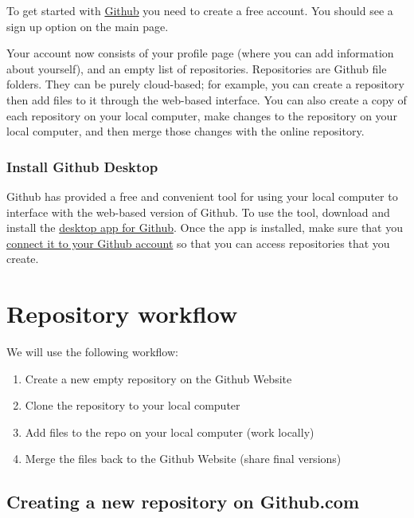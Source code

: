 \documentclass[]{book}
\providecommand{\tightlist}{%
  \setlength{\itemsep}{0pt}\setlength{\parskip}{0pt}}
\theoremstyle{definition}
\theoremstyle{definition}
\theoremstyle{definition}
\theoremstyle{remark}
\begin{document}
To get started with \href{https://github.com}{Github} you need to create
a free account. You should see a sign up option on the main page.

Your account now consists of your profile page (where you can add
information about yourself), and an empty list of repositories.
Repositories are Github file folders. They can be purely cloud-based;
for example, you can create a repository then add files to it through
the web-based interface. You can also create a copy of each repository
on your local computer, make changes to the repository on your local
computer, and then merge those changes with the online repository.

\subsection{Install Github Desktop}\label{install-github-desktop}

Github has provided a free and convenient tool for using your local
computer to interface with the web-based version of Github. To use the
tool, download and install the \href{https://desktop.github.com}{desktop
app for Github}. Once the app is installed, make sure that you
\href{https://help.github.com/desktop/guides/getting-started-with-github-desktop/authenticating-to-github/}{connect
it to your Github account} so that you can access repositories that you
create.

\chapter{Repository workflow}\label{repository-workflow}

We will use the following workflow:

\begin{enumerate}
\def\labelenumi{\arabic{enumi}.}
\tightlist
\item
  Create a new empty repository on the Github Website
\item
  Clone the repository to your local computer
\item
  Add files to the repo on your local computer (work locally)
\item
  Merge the files back to the Github Website (share final versions)
\end{enumerate}

\section{Creating a new repository on
Github.com}\label{creating-a-new-repository-on-github.com}
\end{document}
